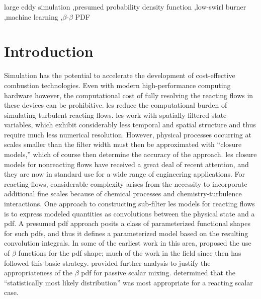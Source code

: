 \documentclass[review]{elsarticle}
\begin{document}
\begin{frontmatter}
\begin{keyword}
  large eddy simulation \sep presumed probability density function \sep low-swirl burner \sep machine learning \sep $\beta$-$\beta$ PDF
\end{keyword}

\end{frontmatter}

\glsresetall


\section{Introduction}
Simulation has the potential to accelerate the development of
cost-effective combustion technologies. Even with modern
high-performance computing hardware however, the computational cost of
fully resolving the reacting flows in these devices can be
prohibitive. \Gls{les} reduce the computational burden of simulating
turbulent reacting flows. \Gls{les} work with spatially filtered state
variables, which exhibit considerably less temporal and spatial
structure and thus require much less numerical resolution. However,
physical processes occurring at scales smaller than the filter width
must then be approximated with ``closure models,'' which of course
then determine the accuracy of the approach. \Gls{les} closure models
for nonreacting flows have received a great deal of recent attention,
and they are now in standard use for a wide range of engineering
applications. For reacting flows, considerable complexity arises from
the necessity to incorporate additional fine scales because of
chemical processes and chemistry-turbulence interactions. One approach
to constructing sub-filter \gls{les} models for reacting flows is to
express modeled quantities as convolutions between the physical state
and a \gls{pdf}. A presumed \gls{pdf} approach posits a class of
parameterized functional shapes for such \glspl{pdf}, and thus it defines
a parameterized model based on the resulting convolution integrals. In
some of the earliest work in this area, \citet{Cook1994} proposed the
use of $\beta$ functions for the \gls{pdf} shape; much of the work in
the field since then has followed this basic
strategy. \citet{Jimenez1997} provided further analysis to justify the
appropriateness of the $\beta$ \gls{pdf} for passive scalar
mixing. \citet{Ihme2008, Ihme2008a} determined that the
``statistically most likely distribution'' was most appropriate
for a reacting scalar case.
\end{document}
